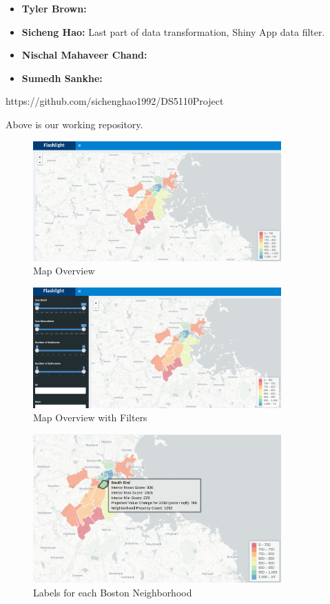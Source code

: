 \documentclass[12pt]{article}
\begin{document}
\begin{itemize}
\item \textbf{Tyler Brown:}
\item \textbf{Sicheng Hao:} Last part of data transformation, Shiny App data filter.
\item \textbf{Nischal Mahaveer Chand:}
\item \textbf{Sumedh Sankhe:}
\end{itemize}

\begin{appendices}

https://github.com/sichenghao1992/DS5110Project

Above is our working repository.

\begin{figure}
  \caption{Map Overview}
  \centering
  \includegraphics[width=0.85\textwidth]{map_overview}
\end{figure}

\begin{figure}
  \caption{Map Overview with Filters}
  \centering
  \includegraphics[width=0.85\textwidth]{map_filter_overview}
\end{figure}

\begin{figure}
  \caption{Labels for each Boston Neighborhood}
  \centering
  \includegraphics[width=0.85\textwidth]{region_label}
\end{figure}


\end{appendices}
\end{document}
